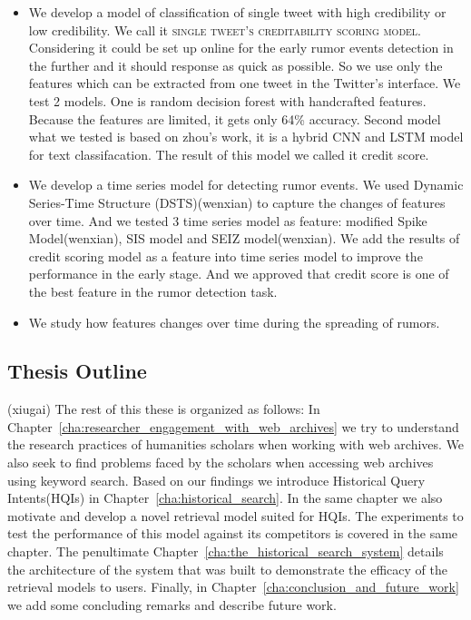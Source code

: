 \begin{itemize}
	
	\item We develop a model of classification of single tweet with high credibility or low credibility. We call it \textsc{single tweet's creditability scoring model}. Considering it could be set up online for the early rumor events detection in the further and it should response as quick as possible. So we use only the features which can be extracted from one tweet in the Twitter's interface. We test 2 models. One is random decision forest with handcrafted features. Because the features are limited, it gets only 64\% accuracy. Second model what we tested is based on zhou's\cite{zhou2015c} work, it is a hybrid CNN and LSTM model for text classifacation. The result of this model we called it credit score.

 	\item We develop a time series model for detecting rumor events. We used Dynamic Series-Time Structure (DSTS)(wenxian) to capture the changes of features over time. And we tested 3 time series model as feature: modified Spike Model(wenxian), SIS model and SEIZ model(wenxian). We add the results of credit scoring model as a feature into time series model to improve the performance in the early stage. And we approved that credit score is one of the best feature in the rumor detection task.

 	\item We study how features changes over time during the spreading of rumors.

 \end{itemize}
 
 
\subsection{Thesis Outline}

(xiugai)
The rest of this these is organized as follows: In Chapter~\ref{cha:researcher_engagement_with_web_archives} we try to understand the research practices of humanities scholars when working with web archives. We also seek to find problems faced by the scholars when accessing web archives using keyword search. Based on our findings we introduce Historical Query Intents(HQIs) in Chapter~\ref{cha:historical_search}. In the same chapter we also motivate and develop a novel retrieval model suited for HQIs. The experiments to test the performance of this model against its competitors is covered in the same chapter. The penultimate Chapter~\ref{cha:the_historical_search_system} details the architecture of the system that was built to demonstrate the efficacy of the retrieval models to users. Finally, in Chapter~\ref{cha:conclusion_and_future_work} we add some concluding remarks and describe future work.

